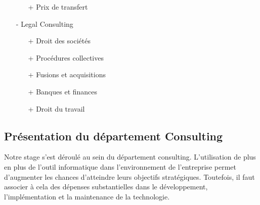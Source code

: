 \begin{itemize}
\begin{itemize}
        \item[+] Prix de transfert
    \end{itemize}
    \item[-]Legal Consulting
    \begin{itemize}
        \item[+] Droit des sociétés
        \item[+] Procédures collectives
        \item[+] Fusions et acquisitions
        \item[+] Banques et finances
        \item[+] Droit du travail
    \end{itemize}
\end{itemize}

\subsection{Présentation du département Consulting}
Notre stage s’est déroulé au sein du département consulting.  L’utilisation de plus en plus de l’outil informatique dans l’environnement de l’entreprise permet d’augmenter les chances d’atteindre leurs objectifs stratégiques. Toutefois, il faut associer à cela des dépenses substantielles dans le développement, l’implémentation et la maintenance de la technologie. 

